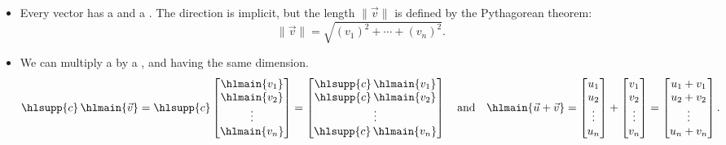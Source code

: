 \documentclass[../main.tex]{subfiles}
\begin{document}
\begin{itemize}[wide]

  \item Every vector has a  and a . The direction is implicit, but the length \(\|\vec{v}\|\) is defined by the Pythagorean theorem:
    \begin{equation}
      \| \vec{v} \| = \sqrt{ (v_{1})^{2} + \cdots + (v_{n})^{2} }.
    \end{equation}


  \item We can multiply a  by a , and  having the same dimension.
    \begin{equation}
      \hlsupp{c}\, \hlmain{\vec{v}}
      = 
      \hlsupp{c}
      \begin{bmatrix}
        \hlmain{v_{1}} \\ \hlmain{v_{2}} \\ \vdots \\ \hlmain{v_{n}}
      \end{bmatrix}
      =
      \begin{bmatrix}
        \hlsupp{c}\, \hlmain{v_{1}} \\ \hlsupp{c}\, \hlmain{v_{2}} \\ \vdots \\ \hlsupp{c}\, \hlmain{v_{n}}
      \end{bmatrix}
      \quad\text{and}\quad
      \hlmain{\vec{u} + \vec{v}}
      =
      \begin{bmatrix}
        u_{1} \\ u_{2} \\ \vdots \\ u_{n}
      \end{bmatrix}
      +
      \begin{bmatrix}
        v_{1} \\ v_{2} \\ \vdots \\ v_{n}
      \end{bmatrix}
      =
      \begin{bmatrix}
        u_{1} + v_{1} \\ u_{2} + v_{2} \\ \vdots \\ u_{n} + v_{n}
      \end{bmatrix}.
    \end{equation}
     


\end{itemize}
\end{document}
